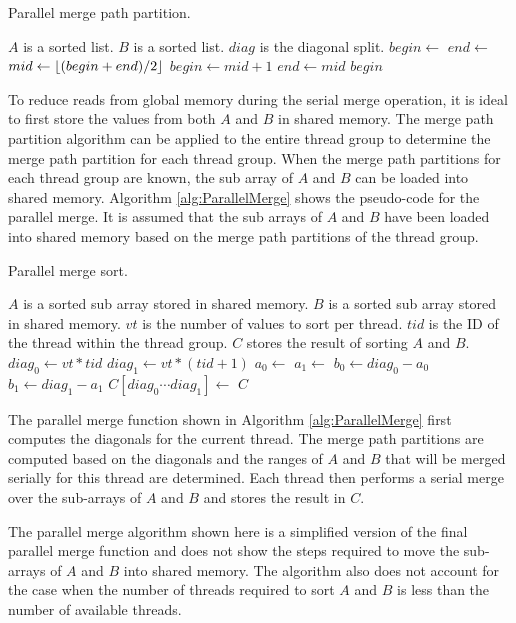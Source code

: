 \begin{algorithm}[h]
\caption{Parallel merge path partition.}
\label{alg:MergePathPartition}
\begin{algorithmic}[1]
\Require $A$ is a sorted list.
\Require $B$ is a sorted list.
\Require $diag$ is the diagonal split.
\State $begin \gets$ 
\State $end \gets$ 
\State $mid \gets \lfloor(begin + end) / 2\rfloor$
\State $begin \gets mid+1$
\Else 
\State $end \gets mid$
\EndIf
\EndWhile
\State \Return $begin$
\EndFunction
\end{algorithmic}
\end{algorithm}

To reduce reads from global memory during the serial merge operation, it is ideal to first store the values from both $A$ and $B$ in shared memory. The merge path partition algorithm can be applied to the entire thread group to determine the merge path partition for each thread group. When the merge path partitions for each thread group are known, the sub array of $A$ and $B$ can be loaded into shared memory. Algorithm \ref{alg:ParallelMerge} shows the pseudo-code for the parallel merge. It is assumed that the sub arrays of $A$ and $B$ have been loaded into shared memory based on the merge path partitions of the thread group.

\begin{algorithm}[H]
\caption{Parallel merge sort.}
\label{alg:ParallelMerge}
\begin{algorithmic}[1]
\Require $A$ is a sorted sub array stored in shared memory.
\Require $B$ is a sorted sub array stored in shared memory.
\Require $vt$ is the number of values to sort per thread.
\Require $tid$ is the ID of the thread within the thread group.
\Ensure $C$ stores the result of sorting $A$ and $B$.
\State $diag_0 \gets vt * tid$
\State $diag_1 \gets vt * (tid+1)$
\State $a_0 \gets$ 
\State $a_1 \gets$ 
\State $b_0 \gets diag_0 - a_0$
\State $b_1 \gets diag_1 - a_1$
\State $C[diag_0 \cdots diag_1] \gets$ 
\State \Return $C$
\EndFunction
\end{algorithmic}
\end{algorithm}

The parallel merge function shown in Algorithm \ref{alg:ParallelMerge} first computes the diagonals for the current thread. The merge path partitions are computed based on the diagonals and the ranges of $A$ and $B$ that will be merged serially for this thread are determined. Each thread then performs a serial merge over the sub-arrays of $A$ and $B$ and stores the result in $C$. 

The parallel merge algorithm shown here is a simplified version of the final parallel merge function and does not show the steps required to move the sub-arrays of $A$ and $B$ into shared memory. The algorithm also does not account for the case when the number of threads required to sort $A$ and $B$ is less than the number of available threads.
